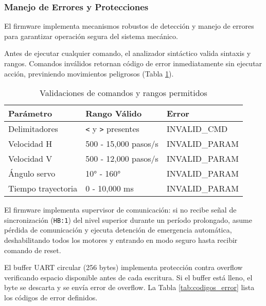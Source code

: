 \subsubsection{Manejo de Errores y Protecciones}

El firmware implementa mecanismos robustos de detección y manejo de errores para garantizar operación segura del sistema mecánico.

Antes de ejecutar cualquier comando, el analizador sintáctico valida sintaxis y rangos. Comandos inválidos retornan código de error inmediatamente sin ejecutar acción, previniendo movimientos peligrosos (Tabla \ref{tab:validacion_comandos}).

\begin{table}[H]
\centering
\small
\begin{tabular}{|l|l|l|}
\hline
\textbf{Parámetro} & \textbf{Rango Válido} & \textbf{Error} \\
\hline
Delimitadores & \texttt{<} y \texttt{>} presentes & INVALID\_CMD \\
\hline
Velocidad H & 500 - 15,000 pasos/s & INVALID\_PARAM \\
\hline
Velocidad V & 500 - 12,000 pasos/s & INVALID\_PARAM \\
\hline
Ángulo servo & 10° - 160° & INVALID\_PARAM \\
\hline
Tiempo trayectoria & 0 - 10,000 ms & INVALID\_PARAM \\
\hline
\end{tabular}
\caption{Validaciones de comandos y rangos permitidos}
\label{tab:validacion_comandos}
\end{table}

El firmware implementa supervisor de comunicación: si no recibe señal de sincronización (\texttt{HB:1}) del nivel superior durante un período prolongado, asume pérdida de comunicación y ejecuta detención de emergencia automática, deshabilitando todos los motores y entrando en modo seguro hasta recibir comando de reset.

El buffer UART circular (256 bytes) implementa protección contra overflow verificando espacio disponible antes de cada escritura. Si el buffer está lleno, el byte se descarta y se envía error de overflow. La Tabla \ref{tab:codigos_error} lista los códigos de error definidos.

